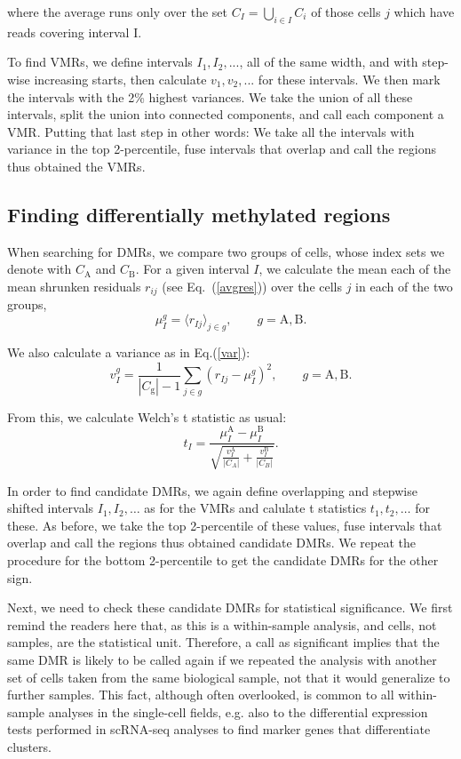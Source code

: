 \documentclass[10pt]{article}
\begin{document}
where the average runs only over the set $C_I=\bigcup_{i\in I}C_i$ of those cells $j$ which have reads covering interval I.

To find VMRs, we define intervals $I_1, I_2, ...$, all of the same width, and with step-wise increasing starts, then calculate $v_1, v_2, ...$ for these intervals.
We then mark the intervals with the 2\% highest variances.
We take the union of all these intervals, split the union into connected components, and call each component a VMR.
Putting that last step in other words:
We take all the intervals with variance in the top 2-percentile, fuse intervals that overlap and call the regions thus obtained the VMRs.

\subsection*{Finding differentially methylated regions}

When searching for DMRs, we compare two groups of cells, whose index sets we denote with $C_\text{A}$ and $C_\text{B}$.
For a given interval $I$, we calculate the mean each of the mean shrunken residuals $r_{ij}$ (see Eq.~(\ref{avgres})) over the cells $j$ in each of the two groups,
\[ \mu^g_I = \langle r_{Ij} \rangle_{j\in g},\qquad g=\text{A},\text{B}. \]

We also calculate a variance as in Eq.(\ref{var}):
\[ v^g_I = \frac{1}{|C_\text{g}|-1}  \sum_{j\in g} \left( r_{Ij} - \mu_I^g \right)^2, 
\qquad g=\text{A},\text{B}.\]

From this, we calculate Welch's t statistic as usual:
\[ t_I = \frac{\mu^\text{A}_I - \mu^\text{B}_I}{\sqrt{\frac{v^\text{A}_I}{|C_A|} + \frac{v^\text{B}_I}{|C_B|}}}.\]

In order to find candidate DMRs, we again define overlapping and stepwise shifted intervals $I_1, I_2, \dots$ as for the VMRs and calulate t statistics $t_1, t_2, \dots$ for these.
As before, we take the top 2-percentile of these values, fuse intervals that overlap and call the regions thus obtained candidate DMRs.
We repeat the procedure for the bottom 2-percentile to get the candidate DMRs for the other sign.

Next, we need to check these candidate DMRs for statistical significance.
We first remind the readers here that, as this is a within-sample analysis, and cells, not samples, are the statistical unit.
Therefore, a call as significant implies that the same DMR is likely to be called again if we repeated the analysis with another set of cells taken from the same biological sample, not that it would generalize to further samples.
This fact, although often overlooked, is common to all within-sample analyses in the single-cell fields, e.g. also to the differential expression tests performed in scRNA-seq analyses to find marker genes that differentiate clusters.
\end{document}
